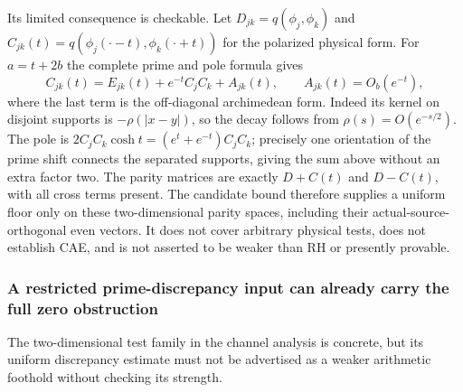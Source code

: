 \documentclass[11pt]{article}
\theoremstyle{remark}
\begin{document}
Its limited consequence is checkable. Let
$D_{jk}=q(\phi_j,\phi_k)$ and
$C_{jk}(t)=q(\phi_j(\cdot-t),\phi_k(\cdot+t))$ for the polarized
physical form. For $a=t+2b$ the complete prime and pole formula gives
\[
 C_{jk}(t)=E_{jk}(t)+e^{-t}C_jC_k+A_{jk}(t),
 \qquad A_{jk}(t)=O_b(e^{-t}),
\]
where the last term is the off-diagonal archimedean form. Indeed its
kernel on disjoint supports is $-\rho(|x-y|)$, so the decay follows
from $\rho(s)=O(e^{-s/2})$. The pole is
$2C_jC_k\cosh t=(e^t+e^{-t})C_jC_k$; precisely one orientation of
the prime shift connects the separated supports, giving the sum above
without an extra factor two. The parity matrices are exactly
$D+C(t)$ and $D-C(t)$, with all cross terms present. The candidate
bound therefore supplies a uniform floor only on these two-dimensional
parity spaces, including their actual-source-orthogonal even vectors.
It does not cover arbitrary physical tests, does not establish CAE,
and is not asserted to be weaker than RH or presently provable.


\subsubsection{A restricted prime-discrepancy input can already carry the full zero obstruction}
\label{sec:ns43-bump-strength}
The two-dimensional test family in the channel analysis is concrete,
but its uniform discrepancy estimate must not be advertised as a
weaker arithmetic foothold without checking its strength.
\end{document}
